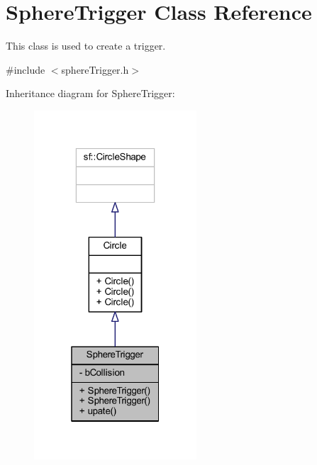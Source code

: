 \hypertarget{class_sphere_trigger}{}\section{Sphere\+Trigger Class Reference}
\label{class_sphere_trigger}


This class is used to create a trigger.  




{\ttfamily \#include $<$sphere\+Trigger.\+h$>$}



Inheritance diagram for Sphere\+Trigger\+:\nopagebreak
\begin{figure}[H]
\begin{center}
\leavevmode
\includegraphics[width=172pt]{class_sphere_trigger__inherit__graph}
\end{center}
\end{figure}


